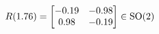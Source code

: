 \documentclass[preview]{standalone}
\begin{document}
\begin{align*}
\special{dvisvgm:raw <g id='unique000'>}R(1.76) = \begin{bmatrix} -0.19 & -0.98 \\ 0.98 & -0.19 \end{bmatrix} \in \text{SO}(2)\special{dvisvgm:raw </g>}
\end{align*}
\end{document}
